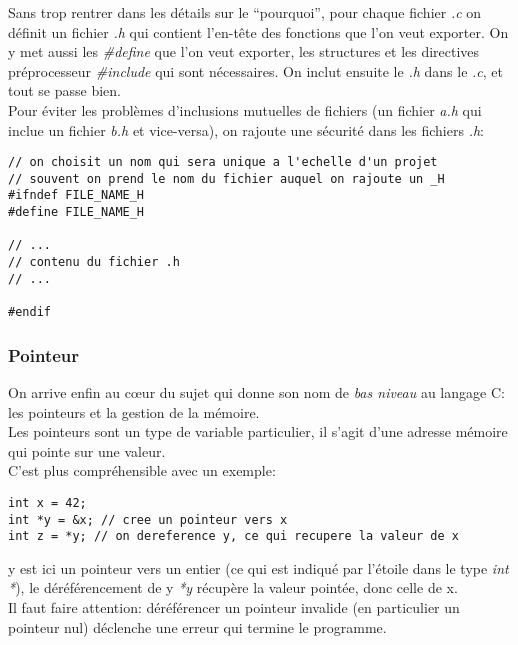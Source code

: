 \documentclass[a4paper,10pt]{article} %
\begin{document}
Sans trop rentrer dans les détails sur le ``pourquoi'', pour chaque fichier \textit{.c} on définit un fichier \textit{.h} qui contient l'en-tête des fonctions que l'on veut exporter. On y met aussi les \textit{\#define} que l'on veut exporter, les structures et les directives préprocesseur \textit{\#include} qui sont nécessaires. On inclut ensuite le \textit{.h} dans le \textit{.c}, et tout se passe bien.\\

Pour éviter les problèmes d'inclusions mutuelles de fichiers (un fichier \textit{a.h} qui inclue un fichier \textit{b.h} et vice-versa), on rajoute une sécurité dans les fichiers \textit{.h}:

\begin{lstlisting}[frame=single]
// on choisit un nom qui sera unique a l'echelle d'un projet
// souvent on prend le nom du fichier auquel on rajoute un _H
#ifndef FILE_NAME_H
#define FILE_NAME_H

// ...
// contenu du fichier .h
// ...

#endif
\end{lstlisting}

\subsubsection{Pointeur}
On arrive enfin au cœur du sujet qui donne son nom de \textit{bas niveau} au langage C: les pointeurs et la gestion de la mémoire.\\

Les pointeurs sont un type de variable particulier, il s'agit d'une adresse mémoire qui pointe sur une valeur.\\

C'est plus compréhensible avec un exemple:

\begin{lstlisting}[frame=single]
int x = 42;
int *y = &x; // cree un pointeur vers x
int z = *y; // on dereference y, ce qui recupere la valeur de x
\end{lstlisting}

y est ici un pointeur vers un entier (ce qui est indiqué par l'étoile dans le type \textit{int *}), le déréférencement de y \textit{*y} récupère la valeur pointée, donc celle de x.\\

Il faut faire attention: déréférencer un pointeur invalide (en particulier un pointeur nul) déclenche une erreur qui termine le programme.\\
\end{document}

